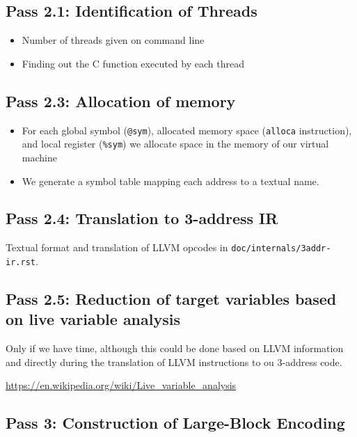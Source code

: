 \documentclass{llncs}
\begin{document}
\subsection*{Pass 2.1: Identification of Threads}

\begin{itemize}
\item Number of threads given on command line
\item Finding out the C function executed by each thread
\end{itemize}

\subsection*{Pass 2.3: Allocation of memory}

\begin{itemize}
\item
  For each global symbol (\verb!@sym!), allocated memory space (\verb!alloca!
  instruction), and local register (\verb!%sym!) we allocate space in the
  memory of our virtual machine
\item
  We generate a symbol table mapping each address to a textual name.
\end{itemize}

\subsection*{Pass 2.4: Translation to 3-address IR}

Textual format and translation of LLVM opcodes in
\verb!doc/internals/3addr-ir.rst!.

\subsection*{Pass 2.5: Reduction of target variables based on live variable
analysis}

Only if we have time, although this could be done based on LLVM information and
directly during the translation of LLVM instructions to ou 3-address code.

\url{https://en.wikipedia.org/wiki/Live_variable_analysis}

\subsection*{Pass 3: Construction of Large-Block Encoding}
\end{document}
